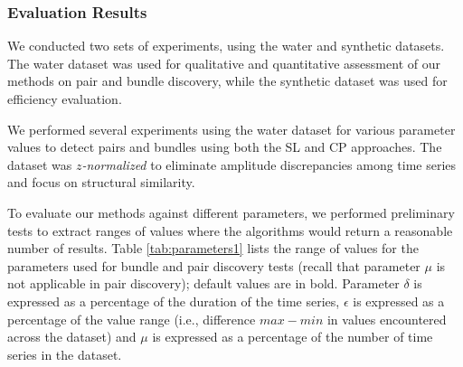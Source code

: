 \subsubsection{Evaluation Results}
\label{subsec:exp_results}
We conducted two sets of experiments, using the water and synthetic datasets. The water dataset was used for qualitative and quantitative assessment of our methods on pair and bundle discovery, while the synthetic dataset was used for efficiency evaluation.


\label{subsubsec:pair_bundle}
We performed several experiments using the water dataset for various parameter values to detect pairs and bundles using both the SL and CP approaches. The dataset was \textit{$z$-normalized} to eliminate amplitude discrepancies among time series and focus on structural similarity.




To evaluate our methods against different parameters, we performed preliminary tests to extract ranges of values where the algorithms would return a reasonable number of results. Table \ref{tab:parameters1} lists the range of values for the parameters used for bundle and pair discovery tests (recall that parameter $\mu$ is not applicable in pair discovery); default values are in bold. Parameter $\delta$ is expressed as a percentage of the duration of the time series, $\epsilon$ is expressed as a percentage of the value range (i.e., difference $max-min$ in values encountered across the dataset) and $\mu$ is expressed as a percentage of the number of time series in the dataset.

